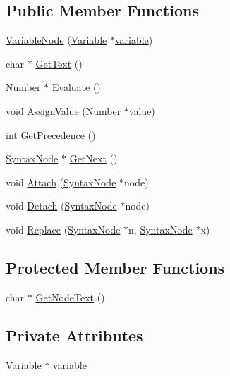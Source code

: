 \subsection*{Public Member Functions}
\begin{DoxyCompactItemize}
\item 
\hyperlink{classVariableNode_a0d3189fa49fab4ac738f114b6a696fd7}{Variable\+Node} (\hyperlink{classVariable}{Variable} $\ast$\hyperlink{classVariableNode_a927ec3221853a677fbccfee2a021bf1a}{variable})
\item 
char $\ast$ \hyperlink{classVariableNode_ae1ebd067d7cb5f996fe629d06db5ec77}{Get\+Text} ()
\item 
\hyperlink{structNumber}{Number} $\ast$ \hyperlink{classVariableNode_a7ebbe9072eb78b5790befed3a42b2dc2}{Evaluate} ()
\item 
void \hyperlink{classVariableNode_a8134cc1627925a0327e6c62eef810cdc}{Assign\+Value} (\hyperlink{structNumber}{Number} $\ast$value)
\item 
int \hyperlink{classVariableNode_ad86b7e8ec992434c80ebc1804f483517}{Get\+Precedence} ()
\item 
\hyperlink{classSyntaxNode}{Syntax\+Node} $\ast$ \hyperlink{classVariableNode_a3559e2232ef0e0778fde92883ff8957f}{Get\+Next} ()
\item 
void \hyperlink{classVariableNode_a9ef2e7ff5c7636e789ef9385190a0660}{Attach} (\hyperlink{classSyntaxNode}{Syntax\+Node} $\ast$node)
\item 
void \hyperlink{classVariableNode_a7d241e4c22a3443a7aca3b73d4882b89}{Detach} (\hyperlink{classSyntaxNode}{Syntax\+Node} $\ast$node)
\item 
void \hyperlink{classVariableNode_aaea4810a27f9b07552df4bcdf6d59d86}{Replace} (\hyperlink{classSyntaxNode}{Syntax\+Node} $\ast$n, \hyperlink{classSyntaxNode}{Syntax\+Node} $\ast$x)
\end{DoxyCompactItemize}
\subsection*{Protected Member Functions}
\begin{DoxyCompactItemize}
\item 
char $\ast$ \hyperlink{classVariableNode_ab76eda982f1625774b982fd148462102}{Get\+Node\+Text} ()
\end{DoxyCompactItemize}
\subsection*{Private Attributes}
\begin{DoxyCompactItemize}
\item 
\hyperlink{classVariable}{Variable} $\ast$ \hyperlink{classVariableNode_a927ec3221853a677fbccfee2a021bf1a}{variable}
\end{DoxyCompactItemize}
